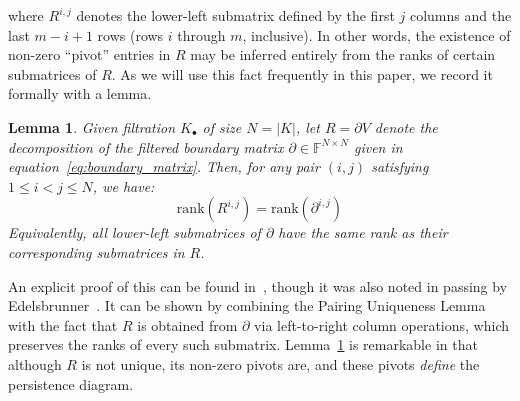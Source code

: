 \documentclass[10pt]{article}
\numberwithin{equation}{section}
\newcommand{\+}{%
	\raisebox{0.18ex}{\scaleobj{0.55}{+}}
}
\newtheorem{lemma}{Lemma}
\theoremstyle{definition}
\theoremstyle{definition}
\begin{document}
where $R^{i, j}$ denotes the lower-left submatrix defined by the first $j$ columns and the last $m - i + 1$ rows (rows $i$ through $m$, inclusive). 
In other words, the existence of non-zero ``pivot'' entries in $R$ may be inferred entirely from the ranks of certain submatrices of $R$.   
As we will use this fact frequently in this paper, we record it formally with a lemma. 
\begin{lemma}\label{lemma:rank}
Given filtration $K_\bullet$ of size $N = \lvert K \rvert$, let $R = \partial V$ denote the decomposition of the filtered boundary matrix $\partial \in \mathbb{F}^{N \times N}$ given in equation~\eqref{eq:boundary_matrix}. Then, for any pair $(i,j)$ satisfying $1 \leq i < j \leq N$, we have:
	\begin{equation}\label{eq:lower_left_rank}
		\mathrm{rank}(R^{i,j}) = \mathrm{rank}(\partial^{i, j})
	\end{equation}
Equivalently, all lower-left submatrices of $\partial$ have the same rank as their corresponding submatrices in $R$.
\end{lemma} %
\noindent
An explicit proof of this can be found in~\cite{dey2022computational}, though it was also noted in passing by Edelsbrunner~\cite{edelsbrunner2000topological}. It can be shown by combining the Pairing Uniqueness Lemma with the fact that $R$ is obtained from $\partial$ via left-to-right column operations, which preserves the ranks of every such submatrix.
Lemma~\ref{lemma:rank} is remarkable in that although $R$ is not unique, its non-zero pivots are, and these pivots \emph{define} the persistence diagram. 
\end{document}
